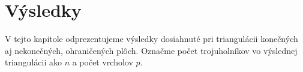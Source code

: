 \newcommand{\ApplyGradientH}[1]{%
  \iftoggle{inTableHeader}{#1}{
    \ifdim #1 pt > \MidNumberH pt
        \pgfmathsetmacro{\PercentColor}{max(min(100.0*(#1 - \MidNumberH)/(\MaxNumberH-\MidNumberH),100.0),0.00)} %
        \colorbox{red!\PercentColor!yellow}{#1}
    \else
        \pgfmathsetmacro{\PercentColor}{max(min(100.0*(\MidNumberH - #1)/(\MidNumberH-\MinNumberH),100.0),0.00)} %
        \colorbox{green!\PercentColor!yellow}{#1}
    \fi
  }
  }




\renewcommand{\arraystretch}{1}
\setlength{\fboxsep}{2mm} %
\setlength{\tabcolsep}{-4pt}

\chapter{Výsledky}
\label{kap:results}

V tejto kapitole odprezentujeme výsledky dosiahnuté pri triangulácii konečných aj 
nekonečných, ohraničených plôch. Označme počet trojuholníkov vo výslednej triangulácii 
ako $n$ a počet vrcholov $p$.

